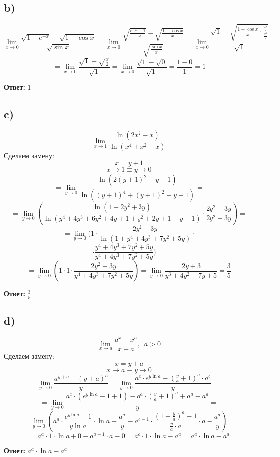 \documentclass[a4paper,12pt]{article}
\begin{document}
\subsection*{b)}
\[
\lim_{x \rightarrow 0} \frac{\sqrt{1- e^{-x}} - \sqrt{1 - \cos x}}{\sqrt{\sin x}} = \lim_{x \rightarrow 0} \frac{\sqrt{\frac{e^{-x} - 1}{-x}} - \sqrt{\frac{1-\cos x}{x}}}{\sqrt{\frac{\sin x}{x}}} = \lim_{x \rightarrow 0} \frac{\sqrt{1} - \sqrt{\frac{1 - \cos x}{x} \cdot \frac{\frac{x^2}{2}}{\frac{x^2}{2}}}}{\sqrt{1}} = 
\]
\[
= \lim_{x \rightarrow 0} \frac{\sqrt{1} - \sqrt{\frac{x}{2}}}{\sqrt{1}} = \lim_{x \rightarrow 0} \frac{\sqrt{1} - \sqrt{0}}{\sqrt{1}} = \frac{1 - 0}{1} = 1
\]
\begin{center}
\textbf{Ответ:} 1
\end{center}

\subsection*{c)}
\[
\lim_{x \rightarrow 1} \frac{\ln (2x^2 - x)}{\ln (x^4 + x^2 - x)}
\]
Сделаем замену:
\[
x = y + 1
\]
\[
x \rightarrow 1 \equiv y \rightarrow 0
\]
\[
= \lim_{y \rightarrow 0} \frac{\ln(2(y+1)^2 -y - 1)}{\ln((y+1)^4 + (y+1)^2 - y -1)} = 
\]
\[
= \lim_{y \rightarrow 0} \left( \frac{\ln (1 + 2y^2 + 3y)}{\ln (y^4 + 4y^3 + 6y^2 + 4y + 1 + y^2 + 2y + 1 - y - 1)} \cdot \frac{2y^2 + 3y}{ 2y^2 + 3y} \right) =
\]
\[
= \lim_{y \rightarrow 0} ( 1 \cdot \frac{2y^2 + 3y}{\ln (1 + y^4 + 4y^3 + 7y^2 + 5y )} \cdot \]
\[
\cdot
 \frac{y^4 + 4y^3 + 7y^2 + 5y }{y^4 + 4y^3 + 7y^2 + 5y } )= 
\]
\[
= 
\lim_{y \rightarrow 0} \left( 1 \cdot 1 \cdot \frac{2y^2 + 3y}{y^4 + 4y^3 + 7y^2 + 5y}  \right)= \lim_{y \rightarrow 0} \frac{2y + 3}{y^3 + 4y^2 + 7y + 5} = 
\frac{3}{5}
\]
\begin{center}
\textbf{Ответ:} $\frac{3}{5}$
\end{center}

\subsection*{d)}
\[
\lim_{x \rightarrow a} \frac{a^x - x^a}{x -a }, \; \; a > 0 
\]
Сделаем замену:
\[
x = y + a
\]
\[
x \rightarrow a \equiv y \rightarrow 0
\]
\[
\lim_{y \rightarrow 0} \frac{a^{y+a} - (y+a)^a}{y} = \lim_{y \rightarrow 0} \frac{a^{a} \cdot e^{y\ln a}-  (\frac{y}{a} + 1)^a \cdot a^a}{y} = 
\]
\[
= 
\lim_{y \rightarrow 0} \frac{a^{a} \cdot (e^{y\ln a} - 1 + 1) - a^a \cdot (\frac{y}{a} + 1)^a  + a^a - a^a}{y} =
\]
\[
=
\lim_{y \rightarrow 0} \left( a^a \cdot \frac{e^{y \ln a} - 1}{y \ln a} \cdot \ln a+ \frac{a^a}{y} - a^{a-1} \cdot \frac{(1 + \frac{y}{a} )^a - 1}{\frac{y}{a} \cdot a} \cdot a- \frac{a^a}{y}  \right) = 
\]
\[
= a^a \cdot 1 \cdot \ln a + 0 -   a^{a-1} \cdot a - 0= a^a \cdot 1 \cdot  \ln a - a^a = a^a \cdot \ln a - a^a
\]
\begin{center}
\textbf{Ответ: } $a^a \cdot \ln a - a^a$ 
\end{center}
\end{document}
